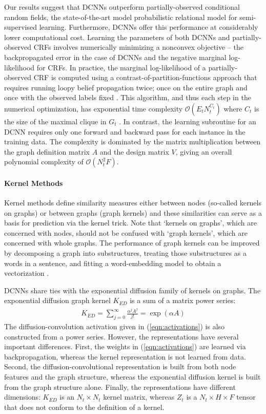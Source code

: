 \documentclass{article}
\begin{document}
Our results suggest that DCNNs outperform partially-observed conditional random fields, the state-of-the-art model probabilistic relational model for semi-supervised learning.  Furthermore, DCNNs offer this performance at considerably lower computational cost.  Learning the parameters of both DCNNs and partially-observed CRFs involves numerically minimizing a nonconvex objective -- the backpropagated error in the case of DCNNs and the negative marginal log-likelihood for CRFs.  In practice, the marginal log-likelihood of a partially-observed CRF is computed using a contrast-of-partition-functions approach that requires running loopy belief propagation twice; once on the entire graph and once with the observed labels fixed \cite{Verbeek:2007tb}.  This algorithm, and thus each step in the numerical optimization, has exponential time complexity $\mathcal{O}(E_tN_t^{C_t})$ where $C_t$ is the size of the maximal clique in $G_t$ \cite{Cohn:2006cv}.  In contrast, the learning subroutine for an DCNN requires only one forward and backward pass for each instance in the training data.   The complexity is dominated by the matrix multiplication between the graph definition matrix $A$ and the design matrix $V$, giving an overall polynomial complexity of $\mathcal{O}(N_t^2 F)$.  



\paragraph{Kernel Methods}  Kernel methods define similarity measures either between nodes (so-called kernels on graphs)  \cite{Fouss:2012bf} or between graphs (graph kernels) and these similarities can serve as a basis for prediction via the kernel trick. Note that `kernels on graphs', which are concerned with nodes, should not be confused with `graph kernels', which are concerned with whole graphs.  The performance of graph kernels can be improved by decomposing a graph into substructures, treating those substructures as a words in a sentence, and fitting a word-embedding model to obtain a vectorization \cite{Yanardag:2015fm}. 

DCNNs share ties with the exponential diffusion family of kernels on graphs.  The exponential diffusion graph kernel $K_{ED}$ is a sum of a matrix power series:
\begin{align}
    K_{ED} = \sum\limits_{j = 0}^{\infty} \frac{\alpha^j A^j}{j!} = \exp(\alpha A)
\end{align}
The diffusion-convolution activation given in (\ref{eqn:activations}) is also constructed from a power series.  However, the representations have several important differences.  First, the weights in (\ref{eqn:activations}) are learned via backpropagation, whereas the kernel representation is not learned from data.  Second, the diffusion-convolutional representation is built from both node features and the graph structure, whereas the exponential diffusion kernel is built from the graph structure alone.  Finally, the representations have different dimensions: $K_{ED}$ is an $N_t \times N_t$ kernel matrix, whereas $Z_t$ is a $N_t \times H \times F$ tensor that does not conform to the definition of a kernel.
\end{document}
